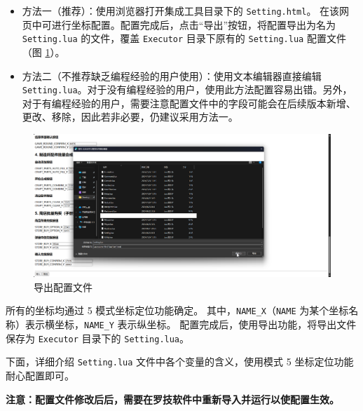 \begin{itemize}
\item 方法一（推荐）：使用浏览器打开集成工具目录下的 \lstinline{Setting.html}。 在该网页中可进行坐标配置。配置完成后，点击“导出”按钮，将配置导出为名为 \lstinline{Setting.lua} 的文件，覆盖 \lstinline{Executor} 目录下原有的 \lstinline{Setting.lua} 配置文件（图 \ref{ch2fig-export-setting}）。
\item 方法二（不推荐缺乏编程经验的用户使用）：使用文本编辑器直接编辑 \lstinline{Setting.lua}。对于没有编程经验的用户，使用此方法配置容易出错。另外，对于有编程经验的用户，需要注意配置文件中的字段可能会在后续版本新增、更改、移除，因此若非必要，仍建议采用方法一。
\end{itemize}

\begin{figure}[H]
    \Centering
    \includegraphics[width=\textwidth]{docs/assets/export_setting}
    \caption{导出配置文件}
    \label{ch2fig-export-setting}
\end{figure}

所有的坐标均通过 5 模式坐标定位功能确定。
其中，\lstinline{NAME_X}（\lstinline{NAME} 为某个坐标名称）表示横坐标，\lstinline{NAME_Y} 表示纵坐标。
配置完成后，使用导出功能，将导出文件保存为 \lstinline{Executor} 目录下的 \lstinline{Setting.lua}。

下面，详细介绍 \lstinline{Setting.lua} 文件中各个变量的含义，使用模式 5 坐标定位功能耐心配置即可。

\textbf{\color{red}注意：配置文件修改后后，需要在罗技软件中重新导入并运行以使配置生效。}

